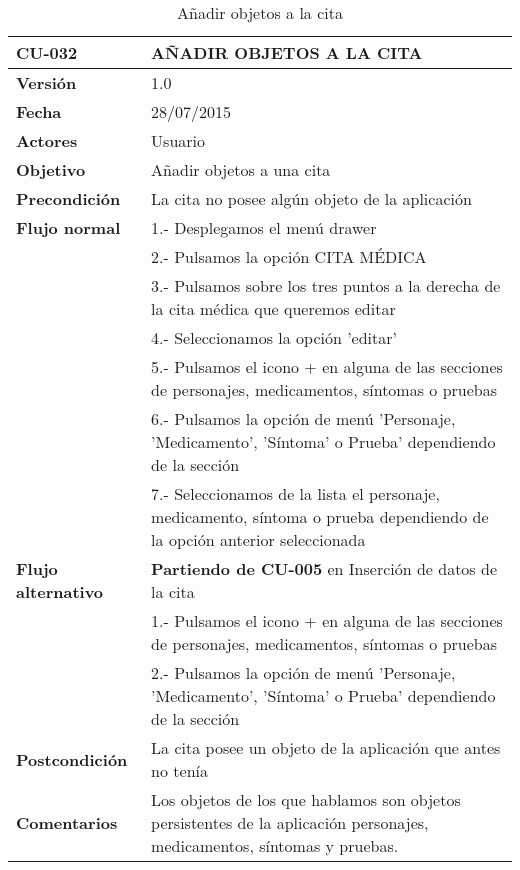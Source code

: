 \documentclass[../pfc.tex]{subfiles}
\begin{document}
	\begin{table}[H]
		\centering
		\begin{tabular}[t]{|p{3cm}|p{9.5cm}|}
			\hline \textbf{CU-032} & \textbf{AÑADIR OBJETOS A LA CITA}\\*
			\hline\hline \textbf{Versión} & 1.0 \\*
			\hline\hline \textbf{Fecha} & 28/07/2015 \\*
			\hline\textbf{Actores} 	& Usuario\\*
			\hline \textbf{Objetivo} & Añadir objetos a una cita\\* 			
			\hline \textbf{Precondición} & La cita no posee algún objeto de la aplicación\\* 
			\hline \textbf{Flujo normal} & 1.- Desplegamos el menú drawer \\* 
			& 2.- Pulsamos la opción CITA MÉDICA\\*	
			& 3.- Pulsamos sobre los tres puntos a la derecha de la cita médica que queremos editar\\*	
			& 4.- Seleccionamos la opción 'editar'\\*	
			& 5.- Pulsamos el icono + en alguna de las secciones de personajes, medicamentos, síntomas o pruebas\\*
			& 6.- Pulsamos la opción de menú 'Personaje, 'Medicamento', 'Síntoma' o Prueba' dependiendo de la sección\\*
			& 7.- Seleccionamos de la lista el personaje, medicamento, síntoma o prueba dependiendo de la opción anterior seleccionada\\*
			\hline \textbf{Flujo alternativo} & \textbf{Partiendo de CU-005} en Inserción de datos de la cita\\*  
			& 1.- Pulsamos el icono + en alguna de las secciones de personajes, medicamentos, síntomas o pruebas\\*
			& 2.- Pulsamos la opción de menú 'Personaje, 'Medicamento', 'Síntoma' o Prueba' dependiendo de la sección\\*
			\hline \textbf{Postcondición} & La cita posee un objeto de la aplicación que antes no tenía\\* 
			\hline \textbf{Comentarios}   & Los objetos de los que hablamos son objetos persistentes de la aplicación personajes, medicamentos, síntomas y pruebas.\\*
			\hline
		\end{tabular}
		\caption{Añadir objetos a la cita}
		\label{tabla:caso034}
	\end{table}
			
\end{document}
